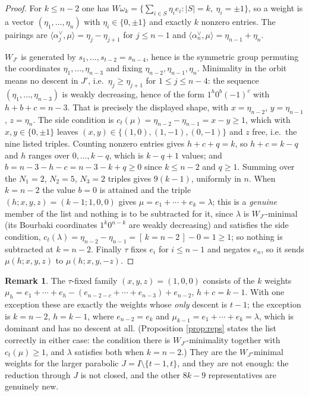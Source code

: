 \documentclass[reqno]{amsart}
\theoremstyle{plain}
\theoremstyle{definition}
\newtheorem{remark}[theorem]{Remark}
\newcommand{\la}{\lambda}
\newcommand{\al}{\alpha}
\newcommand{\om}{\omega}
\begin{document}
\begin{proof}
For $k\le n-2$ one has
$W\om_k=\{\sum_{i\in S}\eta_ie_i:|S|=k,\ \eta_i=\pm1\}$, so a weight is a vector
$(\eta_1,\dots,\eta_n)$ with $\eta_i\in\{0,\pm1\}$ and exactly $k$ nonzero
entries.  The pairings are $\langle\al_j^\vee,\mu\rangle=\eta_j-\eta_{j+1}$ for
$j\le n-1$ and $\langle\al_n^\vee,\mu\rangle=\eta_{n-1}+\eta_n$.

$W_{J'}$ is generated by $s_1,\dots,s_{t-2}=s_{n-4}$, hence is the symmetric
group permuting the coordinates $\eta_1,\dots,\eta_{n-3}$ and fixing
$\eta_{n-2},\eta_{n-1},\eta_n$.  Minimality in the orbit means no descent in
$J'$, i.e.\ $\eta_j\ge\eta_{j+1}$ for $1\le j\le n-4$: the sequence
$(\eta_1,\dots,\eta_{n-3})$ is weakly decreasing, hence of the form
$1^h0^b(-1)^c$ with $h+b+c=n-3$.  That is precisely the displayed shape, with
$x=\eta_{n-2}$, $y=\eta_{n-1}$, $z=\eta_n$.  The side condition is
$c_t(\mu)=\eta_{n-2}-\eta_{n-1}=x-y\ge1$, which with $x,y\in\{0,\pm1\}$ leaves
$(x,y)\in\{(1,0),(1,-1),(0,-1)\}$ and $z$ free, i.e.\ the nine listed triples.
Counting nonzero entries gives $h+c+q=k$, so $h+c=k-q$ and $h$ ranges over
$0,\dots,k-q$, which is $k-q+1$ values; and $b=n-3-h-c=n-3-k+q\ge0$ since
$k\le n-2$ and $q\ge1$.  Summing over the $N_1=2$, $N_2=5$, $N_3=2$ triples
gives $9(k-1)$, uniformly in $n$.  When $k=n-2$ the value $b=0$ is attained and
the triple $(h;x,y,z)=(k-1;1,0,0)$ gives
$\mu=e_1+\cdots+e_{k}=\la$; this is a \emph{genuine} member of the list and
nothing is to be subtracted for it, since $\la$ is $W_{J'}$-minimal (its
Bourbaki coordinates $1^k0^{n-k}$ are weakly decreasing) and satisfies the side
condition, $c_t(\la)=\eta_{n-2}-\eta_{n-1}=[\,k=n-2\,]-0=1\ge1$; so nothing is
subtracted at $k=n-2$.
Finally $\tau$ fixes $e_i$ for $i\le n-1$ and
negates $e_n$, so it sends $\mu(h;x,y,z)$ to $\mu(h;x,y,-z)$.
\end{proof}

\begin{remark}\label{rem:mu_a}
The $\tau$-fixed family $(x,y,z)=(1,0,0)$ consists of the $k$ weights
$\mu_h=e_1+\cdots+e_h-(e_{n-2-c}+\cdots+e_{n-3})+e_{n-2}$, $h+c=k-1$.  With one exception these
are exactly the weights whose \emph{only} descent is $t-1$; the exception is
$k=n-2$, $h=k-1$, where $e_{n-2}=e_k$ and $\mu_{k-1}=e_1+\cdots+e_k=\la$, which
is dominant and has no descent at all.  (Proposition \ref{prop:reps} states the
list correctly in either case: the condition there is $W_{J'}$-minimality
together with $c_t(\mu)\ge1$, and $\la$ satisfies both when $k=n-2$.)  They are the
$W_J$-minimal weights for the larger parabolic $J=I\setminus\{t-1,t\}$, and
they are not enough: the reduction through $J$ is not closed, and the other
$8k-9$ representatives are genuinely new.
\end{remark}
\end{document}
